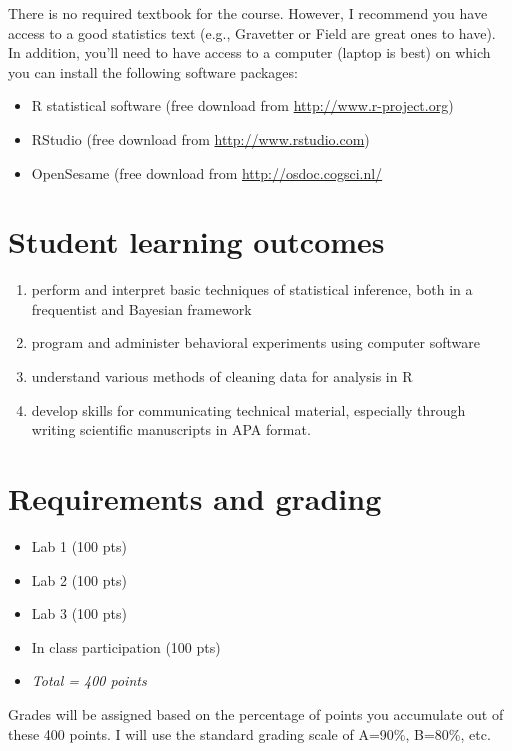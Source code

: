 \documentclass[10pt]{article}
\begin{document}
There is no required textbook for the course. However, I recommend you have access to a good statistics text (e.g., Gravetter or Field are great ones to have).  In addition, you'll need to have access to a computer (laptop is best) on which you can install the following software packages:

\begin{itemize}
\item R statistical software (free download from \href{http://www.r-project.org}{http://www.r-project.org})
\item RStudio (free download from \href{http://www.rstudio.com}{http://www.rstudio.com})
\item OpenSesame (free download from \url{http://osdoc.cogsci.nl/}
\end{itemize}

\section*{Student learning outcomes}
\label{sec:org4bee167}

\begin{enumerate}
\item perform and interpret basic techniques of statistical inference, both in a frequentist and Bayesian framework
\item program and administer behavioral experiments using computer software
\item understand various methods of cleaning data for analysis in R
\item develop skills for communicating technical material, especially through writing scientific manuscripts in APA format.
\end{enumerate}

\section*{Requirements and grading}
\label{sec:org26dda6d}

\begin{itemize}
\item Lab 1 (100 pts)
\item Lab 2 (100 pts)
\item Lab 3 (100 pts)
\item In class participation (100 pts)
\item \emph{Total = 400 points}
\end{itemize}

Grades will be assigned based on the percentage of points you accumulate out of these 400 points.  I will use the standard grading scale of A=90\%, B=80\%, etc.
\end{document}
